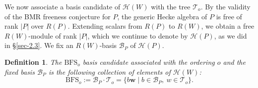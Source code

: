 \documentclass[11pt, reqno]{amsart}
\newcommand{\cB}{\mathcal{B}}
\newcommand{\cH}{\mathcal{H}}
\newcommand{\BFS}{\mathrm{BFS}}
\numberwithin{equation}{section}
\newtheorem{definition}[theorem]{Definition}
\theoremstyle{remark}
\begin{document}
			
		We now associate a basis candidate of $\cH(W)$ with the tree $\mathcal T_o$. By the validity of the BMR freeness conjecture for $P$, the generic Hecke algebra of $P$ is free of rank $|P|$ over $R(P)$. Extending scalars from $R(P)$ to $R(W)$, we obtain a free $R(W)$-module of rank $|P|$, which we continue to denote by $\cH(P)$, as we did in \S\ref{sec-2.3}. We fix an $R(W)$-basis $\mathcal{B}_P$ of $\cH(P)$.
		
		\begin{definition}{\rm
				The \emph{$\BFS_o$ basis candidate} associated with the ordering $o$ and the fixed basis $\cB_P$ is the following collection of elements of $\cH(W)$:
				$$\BFS_o:=\mathcal{B}_P \cdot \mathcal{T}_o= \{b\mathbf{w} \mid b \in \mathcal{B}_P, \ w\in\mathcal{T}_o\}.$$}
		\end{definition}
		
		
		
\end{document}
